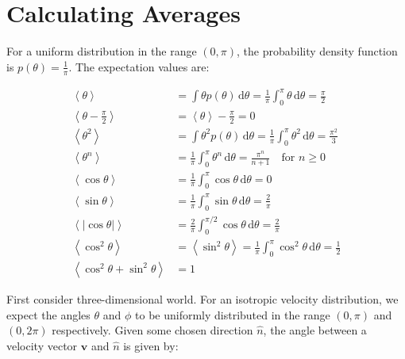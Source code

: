 \documentclass[12pt]{article}
\begin{document}



\pagebreak
\section*{Calculating Averages}



For a uniform distribution in the range $(0, \pi)$, the probability density function is $p(\theta) = \frac{1}{\pi}$. The expectation values are:

\begin{equation}
\begin{split}
    \left\langle \theta \right\rangle &= \int \theta p(\theta) \, \mathrm{d}\theta = \frac{1}{\pi} \int_{0}^{\pi} \theta \, \mathrm{d}\theta = \frac{\pi}{2} \\
    \left\langle \theta - \frac{\pi}{2} \right\rangle &= \left\langle \theta \right\rangle - \frac{\pi}{2} = 0 \\
    \left\langle \theta^{2} \right\rangle &= \int \theta^{2} p(\theta) \, \mathrm{d}\theta = \frac{1}{\pi} \int_{0}^{\pi} \theta^{2} \, \mathrm{d}\theta = \frac{\pi^{2}}{3} \\
    \left\langle \theta^{n} \right\rangle &= \frac{1}{\pi} \int_{0}^{\pi} \theta^{n} \, \mathrm{d}\theta = \frac{\pi^{n}}{n+1} \quad \text{for } n \ge 0 \\
    \left\langle \cos{\theta} \right\rangle &= \frac{1}{\pi} \int_{0}^{\pi} \cos{\theta} \, \mathrm{d}\theta = 0 \\
    \left\langle \sin{\theta} \right\rangle &= \frac{1}{\pi} \int_{0}^{\pi} \sin{\theta} \, \mathrm{d}\theta = \frac{2}{\pi} \\
    \left\langle \left\lvert \cos{\theta} \right\rvert \right\rangle &= \frac{2}{\pi} \int_{0}^{\pi/2} \cos{\theta} \, \mathrm{d}\theta = \frac{2}{\pi} \\
    \left\langle \cos^{2}{\theta} \right\rangle &= \left\langle \sin^{2}{\theta} \right\rangle = \frac{1}{\pi} \int_{0}^{\pi} \cos^{2}{\theta} \, \mathrm{d}\theta = \frac{1}{2} \\
    \left\langle \cos^{2}{\theta} + \sin^{2}{\theta} \right\rangle &= 1
\end{split}
\end{equation}

First consider three-dimensional world. For an isotropic velocity distribution, we expect the angles $\theta$ and $\phi$ to be uniformly distributed in the range $(0, \pi)$ and $(0, 2\pi)$ respectively. Given some chosen direction $\hat{n}$, the angle between a velocity vector $\mathbf{v}$ and $\hat{n}$ is given by:
\end{document}
